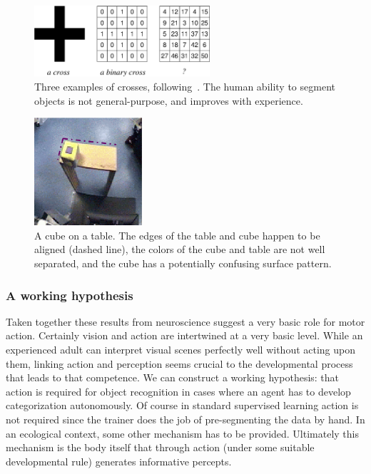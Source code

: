 %
\begin{figure}[tb]
\begin{center}
\includegraphics[width=6.5cm]{number-cross.eps}
\caption{ 
\label{fig:number-cross}
%
Three examples of crosses, following~\cite{manzotti01coscienza}.  The
human ability to segment objects is not general-purpose, and improves
with experience.
%
}
\end{center}
\end{figure}
%
%
\begin{figure}[tb]
\begin{center}
\includegraphics[width=4cm]{setup-sequence.eps}
\caption{ 
\label{fig:setup-sequence}
%
A cube on a table. The edges of the table and cube happen to be
aligned (dashed line), the colors of the cube and table are not well
separated, and the cube has a potentially confusing surface pattern.
%
}
\end{center}
\end{figure}

%
%
%




\subsubsection*{A working hypothesis}


Taken together these results from neuroscience suggest a very basic role
for motor action. Certainly vision and action are
intertwined at a very basic level.  While an
experienced adult can interpret visual scenes perfectly well without
acting upon them, linking action and perception seems crucial to the
developmental process that leads to that competence.  We can construct
a working hypothesis: that action is required for object recognition in
cases where an agent has to develop categorization autonomously. 
Of course in standard supervised learning action is not required since
the trainer does the job of pre-segmenting the data by hand.  In an
ecological context, some other mechanism has to be provided.
Ultimately this mechanism is the body itself that through action
(under some suitable developmental rule) generates informative
percepts.


